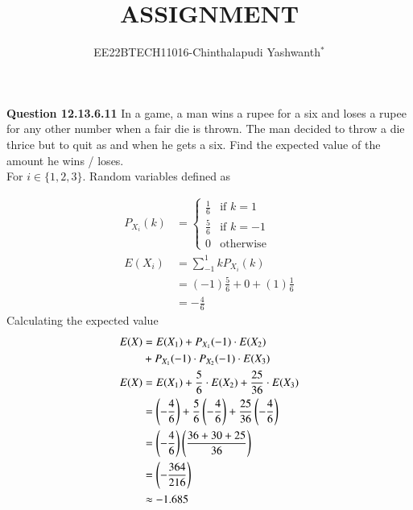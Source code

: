 \documentclass[journal,12pt,twocolumn]{IEEEtran}
\theoremstyle{remark}
\begin{document}

\vspace{3cm}

\title{ASSIGNMENT}
\author{EE22BTECH11016-Chinthalapudi Yashwanth$^{*}$%
}
\maketitle
\newpage
\bigskip
\renewcommand{\thefigure}{\theenumi}
\renewcommand{\thetable}{\theenumi}

\textbf{Question 12.13.6.11}
In a game, a man wins a rupee for a six and loses a rupee for any other number
when a fair die is thrown. The man decided to throw a die thrice but to quit as
and when he gets a six. Find the expected value of the amount he wins / loses.\\
\solution
For $i \in \{1,2,3\}$. Random variables defined as
\begin{table}[!ht]
	
\end{table}
\begin{align}
P_{X_i}(k)&=\begin{cases}
            \frac{1}{6} & \text{if } k=1\\
            \frac{5}{6} & \text{if } k=-1\\
            0 & \text{otherwise}
        \end{cases}\\
E(X_i)&=\sum_{-1}^{1}kP_{X_i}(k)\\
&=(-1)\frac{5}{6}+0+(1)\frac{1}{6}\\
&=-\frac{4}{6}
\end{align}
Calculating the expected value
\begin{align}
E(X)&=E(X_1) + P_{X_{1}} (-1)\cdot E(X_2) \notag\\
 &+ P_{X_{1}} (-1)\cdot P_{X_{2}} (-1)\cdot E(X_3)\\
E(X) &= E(X_1) + \frac{5}{6} \cdot E(X_2) + \frac{25}{36} \cdot E(X_3)\\
       &= \left(-\frac{4}{6}\right) + \frac{5}{6} \left(-\frac{4}{6}\right)
       + \frac{25}{36} \left(-\frac{4}{6}\right)\\
       &= \left(-\frac{4}{6}\right) \left(\frac{36 + 30 + 25}{36}\right)\\
       &= \left(-\frac{364}{216}\right)\\
       &\approx -1.685
\end{align}
\end{document}
